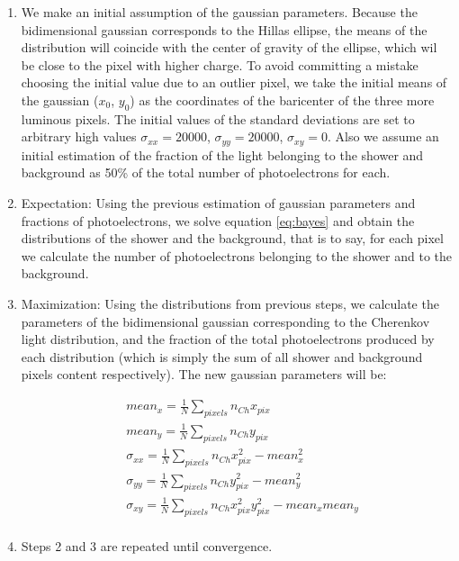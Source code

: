 \documentclass[main.tex]{subfiles}
\begin{document}
\begin{enumerate}
  \item We make an initial assumption of the gaussian parameters. Because the bidimensional gaussian corresponds to the Hillas ellipse, the means of the distribution will coincide with the center of gravity of the ellipse, which wil be close to the pixel with higher charge. To avoid committing a mistake choosing the initial value due to an outlier pixel, we take the initial means of the gaussian ($x_0$, $y_0$) as the coordinates of the baricenter of the three more luminous pixels. The initial values of the standard deviations are set to arbitrary high values $\sigma_{xx}=20000$, $\sigma_{yy}=20000$, $\sigma_{xy}=0$. Also we assume an initial estimation of the fraction of the light belonging to the shower and background as 50\% of the total number of photoelectrons for each.

  \item Expectation: Using the previous estimation of gaussian parameters and fractions of photoelectrons, we solve equation \ref{eq:bayes} and obtain the distributions of the shower and the background, that is to say, for each pixel we calculate the number of photoelectrons belonging to the shower and to the background.

  \item Maximization: Using the distributions from previous steps, we calculate the parameters of the bidimensional gaussian corresponding to the Cherenkov light distribution, and the fraction of the total photoelectrons produced by each distribution (which is simply the sum of all shower and background pixels content respectively). The new gaussian parameters will be:

    \begin{equation}
      \begin{split}
        & mean_{x} = \frac{1}{N}\sum_{pixels} n_{Ch} x_{pix}\\
        & mean_{y} = \frac{1}{N}\sum_{pixels} n_{Ch} y_{pix}\\
        & \sigma_{xx} = \frac{1}{N}\sum_{pixels} n_{Ch} x_{pix}^{2} - mean_{x}^2\\
        & \sigma_{yy} = \frac{1}{N}\sum_{pixels} n_{Ch} y_{pix}^{2} - mean_{y}^2\\
        & \sigma_{xy} = \frac{1}{N}\sum_{pixels} n_{Ch} x_{pix}^{2} y_{pix}^{2} - mean_{x}mean_{y}\\
      \end{split}
    \end{equation}
  \item Steps 2 and 3 are repeated until convergence.\\
    
\end{enumerate}
\end{document}
